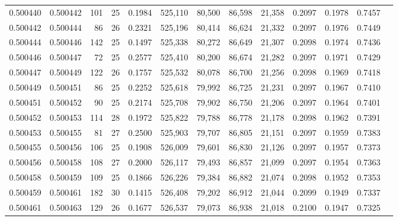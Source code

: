 \begin{tabular}{rrrrrrrrrrrrr}
0.500440 & 0.500442 & 101 &  25 &                                     0.1984 & 525,110 &  80,500 &  86,598 &  21,358 & 0.2097 & 0.1978 & 0.7457 \\
0.500442 & 0.500444 &  86 &  26 &                                     0.2321 & 525,196 &  80,414 &  86,624 &  21,332 & 0.2097 & 0.1976 & 0.7449 \\
0.500444 & 0.500446 & 142 &  25 &                                     0.1497 & 525,338 &  80,272 &  86,649 &  21,307 & 0.2098 & 0.1974 & 0.7436 \\
0.500446 & 0.500447 &  72 &  25 &                                     0.2577 & 525,410 &  80,200 &  86,674 &  21,282 & 0.2097 & 0.1971 & 0.7429 \\
0.500447 & 0.500449 & 122 &  26 &                                     0.1757 & 525,532 &  80,078 &  86,700 &  21,256 & 0.2098 & 0.1969 & 0.7418 \\
0.500449 & 0.500451 &  86 &  25 &                                     0.2252 & 525,618 &  79,992 &  86,725 &  21,231 & 0.2097 & 0.1967 & 0.7410 \\
0.500451 & 0.500452 &  90 &  25 &                                     0.2174 & 525,708 &  79,902 &  86,750 &  21,206 & 0.2097 & 0.1964 & 0.7401 \\
0.500452 & 0.500453 & 114 &  28 &                                     0.1972 & 525,822 &  79,788 &  86,778 &  21,178 & 0.2098 & 0.1962 & 0.7391 \\
0.500453 & 0.500455 &  81 &  27 &                                     0.2500 & 525,903 &  79,707 &  86,805 &  21,151 & 0.2097 & 0.1959 & 0.7383 \\
0.500455 & 0.500456 & 106 &  25 &                                     0.1908 & 526,009 &  79,601 &  86,830 &  21,126 & 0.2097 & 0.1957 & 0.7373 \\
0.500456 & 0.500458 & 108 &  27 &                                     0.2000 & 526,117 &  79,493 &  86,857 &  21,099 & 0.2097 & 0.1954 & 0.7363 \\
0.500458 & 0.500459 & 109 &  25 &                                     0.1866 & 526,226 &  79,384 &  86,882 &  21,074 & 0.2098 & 0.1952 & 0.7353 \\
0.500459 & 0.500461 & 182 &  30 &                                     0.1415 & 526,408 &  79,202 &  86,912 &  21,044 & 0.2099 & 0.1949 & 0.7337 \\
0.500461 & 0.500463 & 129 &  26 &                                     0.1677 & 526,537 &  79,073 &  86,938 &  21,018 & 0.2100 & 0.1947 & 0.7325 \\

\end{tabular}
